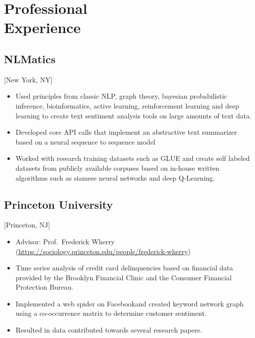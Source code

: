 \documentclass{rkim-resume}
\begin{document}
\maketitle%

\section{Professional \\ Experience}

\subsection{NLMatics}[New York, NY]
\begin{positions}
\end{positions}

\begin{itemize}
  \item Used principles from classic NLP, graph theory, bayesian probabilistic inference, bioinformatics, active learning, reinforcement learning and deep learning to create text sentiment analysis tools on large amounts of text data.
  \item Developed core API calls that implement an abstractive text summarizer based on a neural sequence to sequence model
  \item Worked with research training datasets such as GLUE and create self labeled datasets from publicly available corpuses based on in-house written algorithms such as siamese neural networks and deep Q-Learning.
\end{itemize}

\subsection{Princeton University}[Princeton, NJ]
\begin{positions}
\end{positions}

\begin{itemize}
  \item Advisor: Prof.~Frederick Wherry (\href{https://sociology.princeton.edu/people/frederick-wherry}{https://sociology.princeton.edu/people/frederick-wherry})
  \item Time series analysis of credit card delinquencies based on financial data provided by the Brooklyn Financial Clinic and the Consumer Financial Protection Bureau.
  \item Implemented a web spider on Facebook\@ and created keyword network graph using a co-occurrence matrix to determine customer sentiment.
  \item Resulted in data contributed towards several research papers.
\end{itemize}
\end{document}
